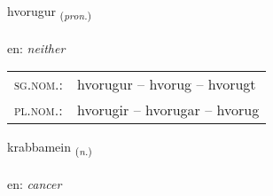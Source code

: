 \documentclass[frontgrid, backgrid]{flacards}\usepackage[]{graphicx}\usepackage[]{xcolor}
\begin{document}
\renewcommand{\flhead}{\vskip5pt \fboxsep=0pt {\small\bfseries\footnotesize Fornafn | Pronoun}}
\renewcommand{\fcfoot}{\vskip5pt \fboxsep=0pt \hspace{2pt}{\small\bfseries\footnotesize 3K}}

\renewcommand{\blhead}{\vskip5pt {\small\bfseries\footnotesize Fornafn | Pronoun }}
\renewcommand{\bcfoot}{\vskip5pt \hspace{2pt}{\small\bfseries\footnotesize 3K}}


{hvorugur \small{\textsubscript{(\textit{pron.})}} \\[1ex] %
\textphonetic{[kʰvɔːrʏɣʏr]} \\
en: \emph{neither} \\  [2ex]
\renewcommand*{\arraystretch}{0.8}
\begin{tabular}{ll}
\textsc{sg.nom.}: & hvorugur  --  hvorug -- hvorugt \\ 
\textsc{pl.nom.}: & hvorugir -- hvorugar -- hvorug
\end{tabular}
}

\renewcommand{\flhead}{\vskip5pt \fboxsep=0pt {\small\bfseries\footnotesize Nafnorð | Noun}}
\renewcommand{\fcfoot}{\vskip5pt \fboxsep=0pt \hspace{2pt}{\small\bfseries\footnotesize 3K}}

\renewcommand{\blhead}{\vskip5pt {\small\bfseries\footnotesize Nafnorð | Noun }}
\renewcommand{\bcfoot}{\vskip5pt \hspace{2pt}{\small\bfseries\footnotesize 3K}}


{krabbamein \small{\textsubscript{(\textit{n.})}} \\[1ex] %
\textphonetic{[kʰrapamein]} \\
en: \emph{cancer} \\  [2ex]
\renewcommand*{\arraystretch}{0.8}
}
\end{document}
